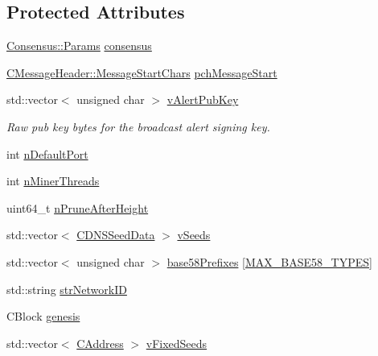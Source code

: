 \subsection*{Protected Attributes}
\begin{DoxyCompactItemize}
\item 
\hyperlink{chainparams_8h_a5e1ca1b35c3dd1a4e20f18445f28dd9c}{Consensus\+::\+Params} \hyperlink{class_c_chain_params_a9eddbbd84a87109643d670766683aae2}{consensus}
\item 
\hyperlink{class_c_message_header_a0d0eeb540cbf4087973f6652ad61878f}{C\+Message\+Header\+::\+Message\+Start\+Chars} \hyperlink{class_c_chain_params_ae403e6b6d36b8f8c4d9d494cf686658c}{pch\+Message\+Start}
\item 
std\+::vector$<$ unsigned char $>$ \hyperlink{class_c_chain_params_adf435bdf2d9cd00936d7da0fb4237921}{v\+Alert\+Pub\+Key}
\begin{DoxyCompactList}\small\item\em Raw pub key bytes for the broadcast alert signing key. \end{DoxyCompactList}\item 
int \hyperlink{class_c_chain_params_a76d9a8dc59e179ca94b6b9e04a93e5f4}{n\+Default\+Port}
\item 
int \hyperlink{class_c_chain_params_a3efbcec19f3883c8300063ec0acf4a35}{n\+Miner\+Threads}
\item 
uint64\+\_\+t \hyperlink{class_c_chain_params_aee6b9132f0ce8dcbfc242c3d2e1293e6}{n\+Prune\+After\+Height}
\item 
std\+::vector$<$ \hyperlink{struct_c_d_n_s_seed_data}{C\+D\+N\+S\+Seed\+Data} $>$ \hyperlink{class_c_chain_params_a9ce50b4162fb2ebf5bd72ad4045aa70c}{v\+Seeds}
\item 
std\+::vector$<$ unsigned char $>$ \hyperlink{class_c_chain_params_a923d956c5d3891d0c682b7ef5410ed8f}{base58\+Prefixes} \mbox{[}\hyperlink{class_c_chain_params_aa294058ec2e3586bd8d03d6c39667058a6b21a525c7fab64a5df656e708f71a98}{M\+A\+X\+\_\+\+B\+A\+S\+E58\+\_\+\+T\+Y\+P\+E\+S}\mbox{]}
\item 
std\+::string \hyperlink{class_c_chain_params_a8542ce21d5b9bdc2eadad8702fdd584a}{str\+Network\+I\+D}
\item 
C\+Block \hyperlink{class_c_chain_params_a2e4119fa75f6ea0c64ba8809dab5c4f8}{genesis}
\item 
std\+::vector$<$ \hyperlink{class_c_address}{C\+Address} $>$ \hyperlink{class_c_chain_params_af3ad79fb5bf4938750317c91e4c4b954}{v\+Fixed\+Seeds}
\item 

\end{DoxyCompactItemize}

